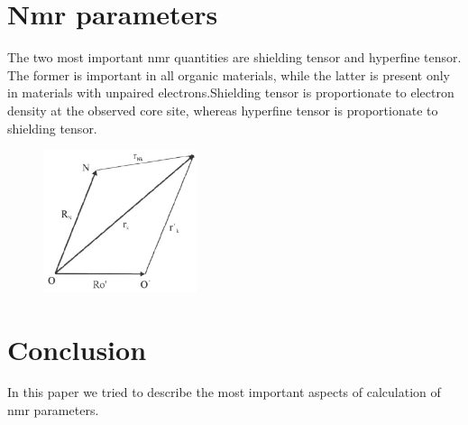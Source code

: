 \documentclass[openany, longbibliography,slovene,a4paper,12pt]{article}
\begin{document}
\section{Nmr parameters}
The two most important nmr quantities are shielding tensor and hyperfine tensor.
The former is important in all organic materials, while the latter is present
only in materials with unpaired electrons.Shielding tensor is 
proportionate to electron density at the observed  core site, whereas hyperfine
tensor is proportionate to shielding tensor.
\begin{minipage}[t]{0.5\linewidth}
  \centering
 \begin{figure}
  \includegraphics[width=0.4\textwidth]{origin_dependance_tensor.png}
  \caption{}
\end{figure}  
\end{minipage}%
\begin{minipage}[t]{0.5\linewidth}
  \centering
   \label{origin_dependence}
\end{minipage}

\section{Conclusion}
In this paper we tried to describe the most important aspects of calculation of nmr parameters.

\newpage {}




\end{document}
